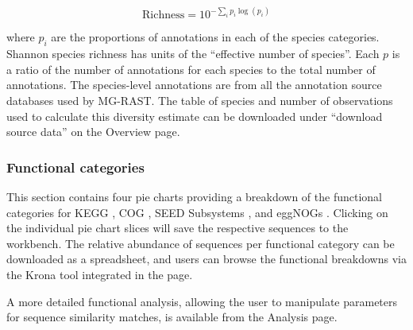 \documentclass[12pt,fullpage]{report}
\begin{document}
$$ \textrm{Richness} = 10^{-\sum_i  p_i \log(p_i) }  $$

\noindent
where $p_i$ are the proportions of annotations in each of the species categories.
Shannon species richness
has units of  the ``effective number of species''. Each $p$ is a ratio of the number of annotations for each species to the total number of annotations.
The species-level annotations are from all the annotation source databases used by MG-RAST. The table of species and number of observations used to calculate this diversity estimate can be downloaded under ``download source data'' on the Overview page.
\subsubsection{Functional categories}

This section contains four pie charts providing a breakdown of the functional categories for KEGG \cite{KEGG}, COG \cite{COG}, \gls{SEED} \gls{Subsystem}s \cite{SUBSYSTEMS}, and eggNOGs \cite{EGGNOG}. Clicking on the individual pie chart slices will save the respective sequences to the workbench.
The relative abundance of sequences per functional category can be downloaded as a spreadsheet, and users can browse the functional breakdowns via the Krona tool \cite{KRONA} integrated in the page.

A more detailed functional analysis, allowing the user to manipulate parameters for sequence similarity matches, is available from the Analysis page.
\end{document}
